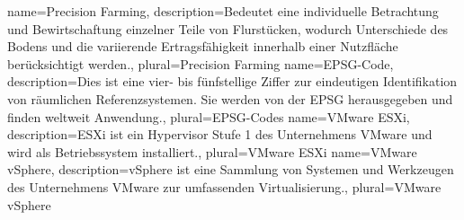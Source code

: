 {
  name=Precision Farming,
  description={Bedeutet eine individuelle Betrachtung und Bewirtschaftung einzelner Teile von Flurstücken, wodurch Unterschiede des Bodens und die variierende Ertragsfähigkeit innerhalb einer Nutzfläche berücksichtigt werden.},
  plural=Precision Farming
}
{
  name=EPSG-Code,
  description={Dies ist eine vier- bis fünfstellige Ziffer zur eindeutigen Identifikation von räumlichen Referenzsystemen. Sie werden von der EPSG herausgegeben und finden weltweit Anwendung.},
  plural=EPSG-Codes
}
{
  name=VMware ESXi,
  description={ESXi ist ein Hypervisor Stufe 1 des Unternehmens VMware und wird als Betriebssystem installiert.},
  plural=VMware ESXi
}
{
  name=VMware vSphere,
  description={vSphere ist eine Sammlung von Systemen und Werkzeugen des Unternehmens VMware zur umfassenden Virtualisierung.},
  plural=VMware vSphere
}